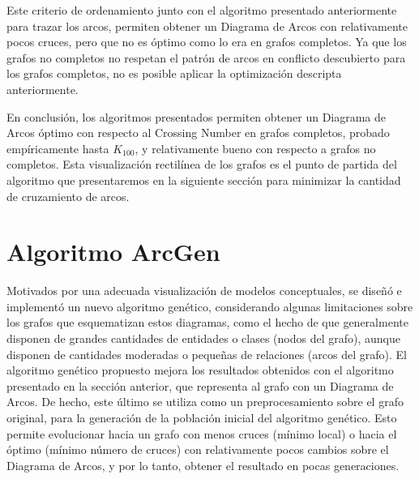 	
	Este criterio de ordenamiento junto con el algoritmo presentado anteriormente  para trazar los arcos, permiten obtener un Diagrama de Arcos con relativamente pocos cruces, pero que  no es óptimo  como lo era en grafos completos. Ya que los grafos no completos  no respetan el patrón de arcos en conflicto descubierto para los grafos completos, 
	no es posible aplicar la optimización descripta anteriormente.
	
	En conclusión, los algoritmos presentados  permiten  obtener un Diagrama de Arcos óptimo con respecto al Crossing Number en grafos completos, probado empíricamente hasta $K_{100}$, y relativamente bueno con respecto a grafos no completos. Esta visualización rectilínea de los grafos es el  punto de partida del algoritmo  que presentaremos en la siguiente sección para minimizar la cantidad de cruzamiento de arcos. 
	

\section{Algoritmo ArcGen}
\label{sec:diseno_algoritmo_arcgen}

	
	Motivados por una adecuada visualización de  modelos conceptuales, se diseñó e implementó  un nuevo algoritmo genético, considerando algunas limitaciones sobre los grafos que esquematizan estos diagramas, como el  hecho de que 
	generalmente disponen de  grandes cantidades de entidades o clases (nodos del grafo), aunque disponen de cantidades moderadas o pequeñas de relaciones (arcos del grafo).
	El  algoritmo genético propuesto  mejora los resultados obtenidos con el algoritmo presentado en la sección anterior, que representa al grafo  con un Diagrama de Arcos. De hecho, este último se utiliza como un preprocesamiento sobre el grafo original,  para la generación de la población inicial del algoritmo genético.  Esto permite evolucionar  hacia  un grafo  con menos cruces (mínimo local) o  hacia el óptimo (mínimo número de cruces)  con  relativamente pocos cambios sobre el Diagrama de Arcos, y por lo tanto, obtener el resultado en  pocas generaciones. %
	
